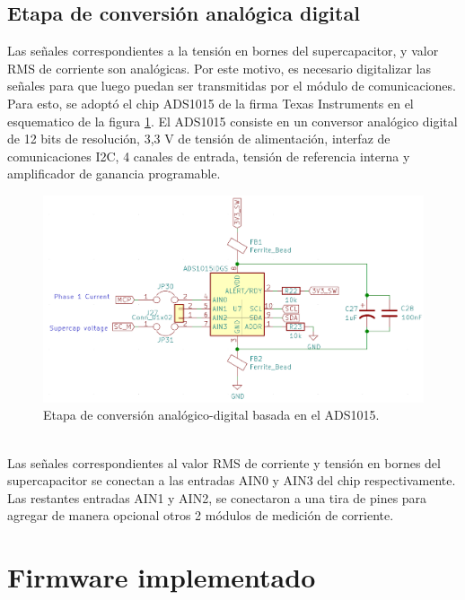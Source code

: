 \subsection{Etapa de conversión analógica digital}
Las señales correspondientes a la tensión en bornes del supercapacitor, y valor RMS de corriente son analógicas. Por este motivo, es necesario digitalizar las señales para que luego puedan ser transmitidas por el módulo de comunicaciones.\\
Para esto, se adoptó el chip ADS1015 de la firma Texas Instruments \citep{ads1015} en el esquematico de la figura \ref{fig:ctoadc}. 
El ADS1015 consiste en un conversor analógico digital de 12 bits de resolución, 3,3 V de tensión de alimentación, interfaz de comunicaciones I2C, 4 canales de entrada, tensión de referencia interna y amplificador de ganancia programable.\\
\begin{figure}[h!]
	\centering
	\includegraphics[width=1.0\linewidth]{Figures/cto_adc}
	\caption{Etapa de conversión analógico-digital basada en el ADS1015.}
	\label{fig:ctoadc}
\end{figure}\\
Las señales correspondientes al valor RMS de corriente y tensión en bornes del supercapacitor se conectan a las entradas AIN0 y AIN3 del chip respectivamente. Las restantes entradas AIN1 y AIN2, se conectaron a una tira de pines para agregar de manera opcional otros 2 módulos de medición de corriente.\\


\section{Firmware implementado}
\label{seccion_firmware}
